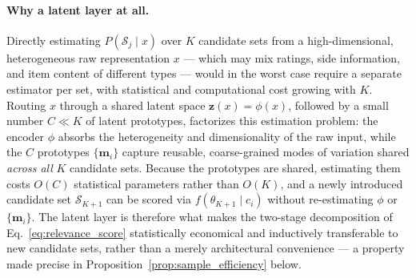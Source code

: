 \documentclass{article}
\theoremstyle{plain}
\theoremstyle{definition}
\theoremstyle{remark}
\begin{document}
\paragraph{Why a latent layer at all.} Directly estimating $P(\mathcal{S}_j \mid x)$ over $K$ candidate sets from a high-dimensional, heterogeneous raw representation $x$ — which may mix ratings, side information, and item content of different types — would in the worst case require a separate estimator per set, with statistical and computational cost growing with $K$. Routing $x$ through a shared latent space $\mathbf{z}(x) = \phi(x)$, followed by a small number $C \ll K$ of latent prototypes, factorizes this estimation problem: the encoder $\phi$ absorbs the heterogeneity and dimensionality of the raw input, while the $C$ prototypes $\{\mathbf{m}_i\}$ capture reusable, coarse-grained modes of variation shared \emph{across all} $K$ candidate sets. Because the prototypes are shared, estimating them costs $O(C)$ statistical parameters rather than $O(K)$, and a newly introduced candidate set $\mathcal{S}_{K+1}$ can be scored via $f(\theta_{K+1} \mid c_i)$ without re-estimating $\phi$ or $\{\mathbf{m}_i\}$. The latent layer is therefore what makes the two-stage decomposition of Eq.~\eqref{eq:relevance_score} statistically economical and inductively transferable to new candidate sets, rather than a merely architectural convenience — a property made precise in Proposition~\ref{prop:sample_efficiency} below.
\end{document}
